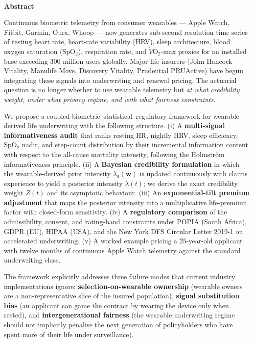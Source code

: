 \documentclass[11pt,a4paper]{article}
\theoremstyle{ia}
\newcommand{\1}{\mathbf{1}}
\begin{document}
\setcounter{page}{1}

\noindent{\color{iaaccent}\rule{2.2cm}{1.2pt}}\\[6pt]
{\sffamily\bfseries\large\color{iadark}Abstract}
\par\vspace{6pt}

\noindent
Continuous biometric telemetry from consumer wearables --- Apple Watch,
Fitbit, Garmin, Oura, Whoop --- now generates sub-second resolution
time series of resting heart rate, heart-rate variability (HRV), sleep
architecture, blood oxygen saturation (SpO$_2$), respiration rate, and
$\dot{V}\mathrm{O}_2$-max proxies for an installed base exceeding 300
million users globally. Major life insurers (John Hancock Vitality,
Manulife Move, Discovery Vitality, Prudential PRUActive) have begun
integrating these signals into underwriting and renewal pricing. The
actuarial question is no longer whether to use wearable telemetry but
\emph{at what credibility weight, under what privacy regime, and with
what fairness constraints}.

We propose a coupled biometric--statistical--regulatory framework for
wearable-derived life underwriting with the following structure. (i) A
\textbf{multi-signal informativeness audit} that ranks resting HR,
nightly HRV, sleep efficiency, SpO$_2$ nadir, and step-count
distribution by their incremental information content with respect to
the all-cause mortality intensity, following the Holmstr\"om
informativeness principle. (ii) A \textbf{Bayesian credibility
formulation} in which the wearable-derived prior intensity
$\lambda_0(\mathbf{w})$ is updated continuously with claims experience
to yield a posterior intensity $\lambda(t)$; we derive the exact
credibility weight $Z(t)$ and its asymptotic behaviour. (iii) An
\textbf{exponential-tilt premium adjustment} that maps the posterior
intensity into a multiplicative life-premium factor with closed-form
sensitivity. (iv) A \textbf{regulatory comparison} of the
admissibility, consent, and rating-band constraints under POPIA (South
Africa), GDPR (EU), HIPAA (USA), and the New York DFS Circular Letter
2019-1 on accelerated underwriting. (v) A worked example pricing a
25-year-old applicant with twelve months of continuous Apple Watch
telemetry against the standard underwriting class.

The framework explicitly addresses three failure modes that current
industry implementations ignore: \textbf{selection-on-wearable
ownership} (wearable owners are a non-representative slice of the
insured population), \textbf{signal substitution bias} (an applicant
can game the contract by wearing the device only when rested), and
\textbf{intergenerational fairness} (the wearable underwriting regime
should not implicitly penalise the next generation of policyholders
who have spent more of their life under surveillance).
\end{document}

